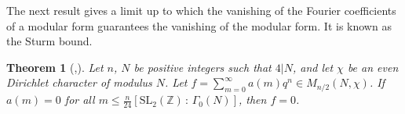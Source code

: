 \documentclass[11pt,a4paper]{amsart}
\newtheorem{theorem}{Theorem}[section]
\theoremstyle{definition}
\newcommand{\SZ}{\mathbb{Z}}                    %
\begin{document}


The next result gives a limit up to which the vanishing of the Fourier coefficients of a modular form guarantees the vanishing of the modular form. It is known as the Sturm bound. %
\begin{theorem}[{\cite[Theorem 1]{sturm1987congruence},\cite[Lemma 3.1]{kumar2014note}}]
\label{thm:sturmbound}
Let $n$, $N$ be positive integers such that $4|N$, and let $\chi$ be an even Dirichlet character of modulus $N$. Let $f=\sum_{m=0}^{\infty} a(m)q^n \in M_{n/2}(N,\chi)$. If $a(m)=0$ for all $m \leq \frac{n}{24} [\mathrm{SL}_2(\SZ) \, : \, \Gamma_0(N) ]$, then $f=0$.
\end{theorem}
\begin{comment}
\begin{proof} If $k$ is even, then the statement follows from the standard version of the Sturm bound \cite[Theorem 1]{sturm1987congruence}.
	
Suppose that $k$ is odd and set $B=\frac{k}{24} [\mathrm{SL}_2(\SZ) \, : \, \Gamma(N) ]$. Since $a_f(n)=0$ for $n \leq B$, the Fourier expansion of $f$ at $\infty$ can be written as
\[ f=q^{B+1}(a_f(B+2)+a_f(B+2)q+dots). \]
The function $f^4 \in M_{2k}(\Gamma(N))$ is an integral weight modular form. The Fourier expansion of $f^4$ at $\infty$ looks as
\[ f^4 = q^4(B+1) \left( sum_{n=0}^{\infty} c_n q^n \right) \]
where $c_n$ is in terms of $a_f(i)$ for $i \leq n$. Since the Fourier coefficients of $f^4$ are zero up to $4B = \frac{2k}{12}[\mathrm{SL}_2(\SZ) \, : \, \Gamma(N) ]$, the even case above implies that $f^4=0$. This implies that $f=0$, which proves the lemma. 
\end{proof}
ISSUES: 
1. The multiplier system of the eta function is NOT a Dirichlet character (of the element d), i.e. a homomorphism from SL\_2 but instead its associated with the metaplectic group, the double cover of SL\_2. Solution: scale up both the eta product and the theta function a la Gordon and Sinor
2. The theta function is a priori modular for Gamma(n). We need modularity for Gamma\_0(n) or at least for  Gamma\_1(n). And the characters also need to agree.
\end{comment}
\end{document}
